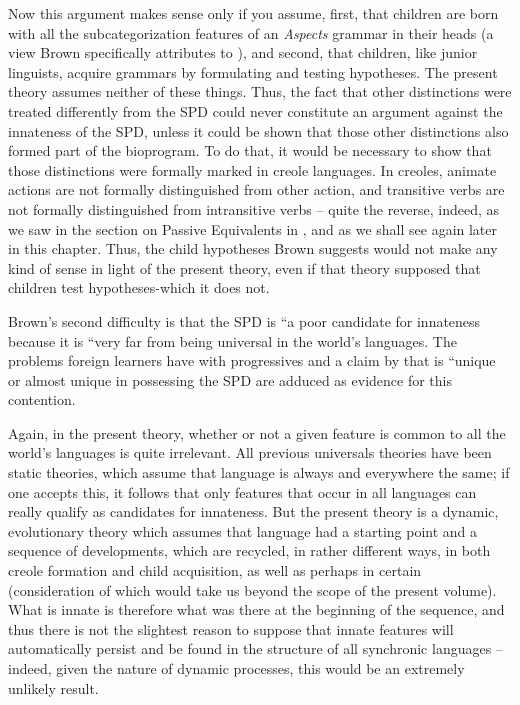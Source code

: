 Now this argument makes sense only if you assume, first, that
children are born with all the subcategorization features of an \textit{Aspects} grammar in their heads (a view Brown specifically attributes to \citealt{McNeill1966}), and second, that children, like junior linguists, acquire grammars by formulating and testing hypotheses. The present theory assumes neither of these things. Thus, the fact that other distinctions were treated differently from the SPD could never constitute an argument against the innateness of the SPD, unless it could be shown that those other distinctions also formed part of the bioprogram. To do that, it would be necessary to show that those distinctions were formally marked in creole languages. In creoles, animate actions are not formally distinguished from other  action, and transitive verbs are not formally distinguished from intransitive verbs -- quite the reverse, indeed, as we saw in the section on Passive Equivalents in , and as we shall see again later in this chapter. Thus, the child hy\-potheses Brown suggests would not make any kind of sense in light of the present theory, even if that theory supposed that children test hypotheses-which it does not.

Brown's second difficulty is that the SPD is ``a poor candidate for innateness because it is ``very far from being universal in the world's languages. The problems foreign learners have with  progressives and a claim by \citet{Joos1964} that  is ``unique or almost unique in possessing the SPD are adduced as evidence for this contention.

Again, in the present theory, whether or not a given feature is common to all the world's languages is quite irrelevant. All previous universals theories have been static theories, which assume that lan\-guage is always and everywhere the same; if one accepts this, it follows that only features that occur in all languages can really qualify as can\-didates for innateness. But the present theory is a dynamic, evolu\-tionary theory which assumes that language had a starting point and a sequence of developments, which are recycled, in rather different ways, in both creole formation and child acquisition, as well as perhaps in certain   (consideration of which would take us beyond the scope of the present volume). What is innate is therefore
what was there at the beginning of the sequence, and thus there is not the slightest reason to suppose that innate features will automati\-cally persist and be found in the structure of all synchronic languages -- indeed, given the nature of dynamic processes, this would be an extremely unlikely result.

